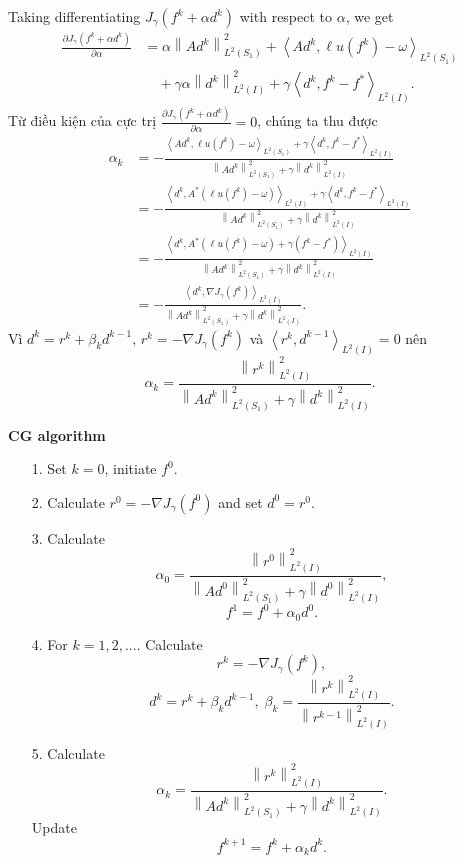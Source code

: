 \documentclass[]{article}
\begin{document}
Taking differentiating $J_\gamma(f^k+\alpha d^k)$ with respect to $\alpha$, we get
\begin{align*}
\frac{\partial J_\gamma(f^k+\alpha d^k)}{\partial \alpha} &= \alpha\left\|Ad^k \right\|_{L^2(S_1)}^2+\left\langle Ad^k,\ell u(f^k)-\omega\right\rangle_{L^2(S_1)}\\[0.2cm]
&\quad+\gamma\alpha\left\| d^k\right\|_{L^2(I)}^2+\gamma\left\langle d^k, f^k-f^*\right\rangle_{L^2(I)}.
\end{align*}
Từ điều kiện của cực trị $\frac{\partial J_\gamma(f^k+\alpha d^k)}{\partial \alpha}=0$, chúng ta thu được
\begin{align*}
\alpha_k&=-\frac{\left\langle Ad^k, \ell u(f^k)-\omega\right\rangle_{L^2(S_1)}+\gamma\left\langle d^k, f^k-f^*\right\rangle_{L^2(I)}}{\left\|Ad^k\right\|^2_{L^2(S_1)}+\gamma\left\|d^k\right\|^2_{L^2(I)}}\\[0.2cm]
&=-\frac{\left\langle d^k, A^*\left(\ell u(f^k)-\omega\right)\right\rangle_{L^2(I)}+\gamma\left\langle d^k, f^k-f^*\right\rangle_{L^2(I)}}{\left\|Ad^k\right\|^2_{L^2(S_1)}+\gamma\left\|d^k\right\|^2_{L^2(I)}}\\[0.2cm]
&=-\frac{\left\langle d^k, A^*\left(\ell u(f^k)-\omega\right)+\gamma(f^k-f^*)\right\rangle_{L^2(I)}}{\left\|Ad^k\right\|^2_{L^2(S_1)}+\gamma\left\|d^k\right\|^2_{L^2(I)}}\\[0.2cm]
&=-\frac{\left\langle d^k,\nabla J_\gamma(f^k)\right\rangle_{L^2(I)}}{\left\|Ad^k\right\|^2_{L^2(S_1)}+\gamma\left\|d^k\right\|^2_{L^2(I)}}.
\end{align*}
Vì $d^k=r^k+\beta_kd^{k-1},\, r^k=-\nabla J_\gamma (f^k)$ và $\left\langle r^k,d^{k-1}\right\rangle_{L^2(I)}=0$ nên 
$$\alpha_k=\frac{\left\|r^k\right\|^2_{L^2(I)}}{\left\|Ad^k\right\|^2_{L^2(S_1)}+\gamma\left\|d^k\right\|^2_{L^2(I)}}.$$

\noindent \textbf{CG algorithm}
\begin{itemize}
	\item[1.] Set $k=0$, initiate $f^0$.
	\item[2.] Calculate $r^0=-\nabla J_\gamma(f^0)$ and set $d^0=r^0$.
	\item[3.] Calculate
	$$\alpha_0=\frac{\left\|r^0\right\|^2_{L^2(I)}}{\left\|Ad^0\right\|^2_{L^2(S_1)}+\gamma\left\|d^0\right\|^2_{L^2(I)}},$$
	$$f^1=f^0+\alpha_0d^0.$$
	\item[4.] For $k=1, 2,...$. Calculate
	$$r^k=-\nabla J_\gamma(f^k),$$
	$$d^k=r^k+\beta_kd^{k-1}, \; \beta_k=\frac{\left\|r^k\right\|^2_{L^2(I)}}{\left\|r^{k-1}\right\|^2_{L^2(I)}}.$$
	\item[5.] Calculate
	$$\alpha_k=\frac{\left\|r^k\right\|^2_{L^2(I)}}{\left\|Ad^k\right\|^2_{L^2(S_1)}+\gamma\left\|d^k\right\|^2_{L^2(I)}}.$$
	Update
	$$f^{k+1}=f^{k}+\alpha_kd^k.$$
\end{itemize}
\end{document}
